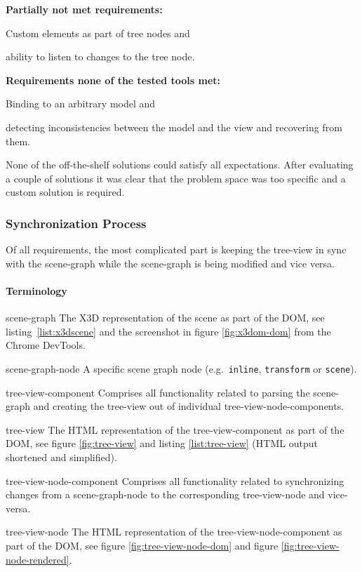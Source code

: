 \textbf{Partially not met requirements:}

\begin{itemize*}
  \item Custom elements as part of tree nodes and
  \item ability to listen to changes to the tree node.
\end{itemize*}

\textbf{Requirements none of the tested tools met:}

\begin{itemize*}
  \item Binding to an arbitrary model and
  \item detecting inconsistencies between the model and the view and recovering from them.
\end{itemize*}

None of the off-the-shelf solutions could satisfy all expectations. After
evaluating a couple of solutions it was clear that the problem space was too
specific and a custom solution is required.

\subsubsection{Synchronization Process}

Of all requirements, the most complicated part is keeping the tree-view in sync
with the scene-graph while the scene-graph is being modified and vice
versa.

\paragraph{Terminology}
\label{terminology}

\begin{description*}
  \item[scene-graph]
    The \gls{X3D} representation of the scene as part of the \gls{DOM}, see listing~\ref{list:x3dscene} and the screenshot in figure \ref{fig:x3dom-dom} from the Chrome DevTools.
  \item[scene-graph-node]
    A specific scene graph node (e.g.~\texttt{inline}, \texttt{transform} or \texttt{scene}).
  \item[tree-view-component]
    Comprises all functionality related to parsing the scene-graph and creating the tree-view out of individual tree-view-node-components.
  \item[tree-view]
    The \gls{HTML} representation of the tree-view-component as part of the \gls{DOM}, see figure \ref{fig:tree-view} and listing \ref{list:tree-view} (\gls{HTML} output
    shortened and simplified).
  \item[tree-view-node-component]
    Comprises all functionality related to synchronizing changes from a scene-graph-node to the corresponding
    tree-view-node and vice-versa.
  \item[tree-view-node]
    The \gls{HTML} representation of the tree-view-node-component as part of the \gls{DOM}, see figure \ref{fig:tree-view-node-dom} and figure \ref{fig:tree-view-node-rendered}.
\end{description*}

